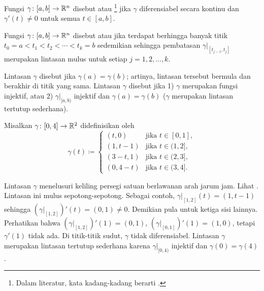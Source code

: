 \begin{defn}
Fungsi $\gamma \colon [a,b] \to {\mathbb{R}}^n$
disebut \emph{}
atau
\emph{}\footnote{Dalam
literatur, kata  kadang-kadang berarti
.}
jika
$\gamma$ diferensiabel secara kontinu dan
$\gamma'(t) \neq 0$ untuk semua $t \in [a,b]$.

Fungsi $\gamma \colon [a,b] \to {\mathbb{R}}^n$ disebut
\emph{} atau
\emph{}
jika terdapat berhingga banyak titik
$t_0 = a < t_1 < t_2 < \cdots < t_k = b$ sedemikian sehingga
pembatasan $\gamma|_{[t_{j-1},t_j]}$ merupakan lintasan mulus untuk setiap
$j=1,2,\ldots,k$.

Lintasan $\gamma$ disebut 
\emph{} jika $\gamma(a) = \gamma(b)$; artinya,
lintasan tersebut bermula dan berakhir di titik yang sama.
Lintasan $\gamma$ disebut \emph{} jika 
1) $\gamma$ merupakan fungsi injektif, atau 2)
$\gamma|_{[a,b)}$ injektif dan $\gamma(a)=\gamma(b)$ ($\gamma$ merupakan
lintasan tertutup sederhana).
\end{defn}


\begin{example} \label{mv:example:unitsquarepath}
Misalkan $\gamma \colon [0,4] \to {\mathbb{R}}^2$ didefinisikan oleh
\begin{equation*}
\gamma(t) \coloneqq
\begin{cases}
(t,0)   & \text{jika } t \in [0,1],\\
(1,t-1) & \text{jika } t \in (1,2],\\
(3-t,1) & \text{jika } t \in (2,3],\\
(0,4-t) & \text{jika } t \in (3,4].
\end{cases}
\end{equation*}
\begin{myfigureht}
\caption{Lintasan $\gamma$ yang menelusuri keliling persegi satuan.\label{fig:squarepath}}
\end{myfigureht}

Lintasan $\gamma$ menelusuri keliling persegi satuan
berlawanan arah jarum jam.  Lihat .  Lintasan ini
mulus sepotong-sepotong.  Sebagai contoh,
$\gamma|_{[1,2]}(t) = (1,t-1)$ sehingga
$(\gamma|_{[1,2]})'(t) = (0,1) \neq 0$.  Demikian pula untuk ketiga sisi lainnya.
Perhatikan bahwa
$(\gamma|_{[1,2]})'(1) = (0,1)$,
$(\gamma|_{[0,1]})'(1) = (1,0)$, tetapi
$\gamma'(1)$ tidak ada.  Di titik-titik sudut, $\gamma$ 
tidak diferensiabel.
Lintasan $\gamma$ merupakan lintasan tertutup sederhana karena $\gamma|_{[0,4)}$
injektif dan $\gamma(0)=\gamma(4)$.
\end{example}

